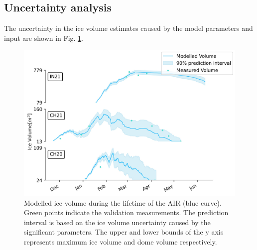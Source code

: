 \documentclass[utf8]{frontiersSCNS} %
\begin{document}
\subsection{Uncertainty analysis}

The uncertainty in the ice volume estimates caused by the model parameters and input are shown in Fig.
\ref{fig:results}.

\begin{figure}
	\begin{center}
		\includegraphics[width=\linewidth]{Figures/icev_results.jpg}
	\end{center}
	\caption{Modelled ice volume during the lifetime of the AIR (blue curve). Green points indicate the validation
		measurements. The prediction interval is based on the ice volume uncertainty caused by the significant parameters.  The
		upper and lower bounds of the y axis represents maximum ice volume and dome volume respectively.  }
	\label{fig:results} \end{figure}


\end{document}
